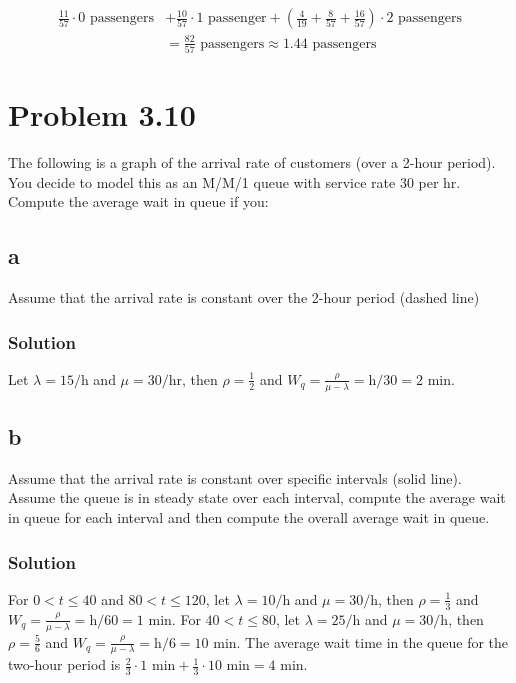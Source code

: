 \documentclass[letterpaper]{amsart}
\begin{document}
\begin{equation*}
\begin{aligned}
  \frac{11}{57}\cdot 0\text{ passengers}
  &+
  \frac{10}{57}\cdot 1\text{ passenger}
  +
  \left(
  \frac{4}{19}
  +
  \frac{8}{57}
  +
  \frac{16}{57}
  \right)\cdot 2\text{ passengers}\\
  &=
  \frac{82}{57}\text{ passengers}
  \approx 1.44\text{ passengers}
\end{aligned}
\end{equation*}


\section{Problem 3.10} %
The following is a graph of the arrival rate of customers (over a 2-hour
period). You decide to model this as an M/M/1 queue with service rate 30
per hr. Compute the average wait in queue if you:
\subsection*{a}
Assume that the arrival rate is constant over the 2-hour period (dashed
line)
\subsubsection*{Solution}
Let
$\lambda=15/\text{h}$
and
$\mu=30/\text{hr}$,
then
$\rho=\frac{1}{2}$
and
$W_q=\frac{\rho}{\mu-\lambda}=\text{h}/30=2\text{ min}$.
\subsection*{b}
Assume that the arrival rate is constant over specific intervals (solid
line). Assume the queue is in steady state over each interval, compute
the average wait in queue for each interval and then compute the overall
average wait in queue.
\subsubsection*{Solution}
For $0<t\leq 40$ and $80<t\leq120$, let
$\lambda=10/\text{h}$
and
$\mu=30/\text{h}$,
then
$\rho=\frac{1}{3}$
and
$W_q=\frac{\rho}{\mu-\lambda}=\text{h}/60=1\text{ min}$.
For $40<t\leq 80$, let
$\lambda=25/\text{h}$
and
$\mu=30/\text{h}$,
then
$\rho=\frac{5}{6}$
and
$W_q=\frac{\rho}{\mu-\lambda}=\text{h}/6=10\text{ min}$.
The average wait time in the queue for the two-hour period is
$\frac{2}{3}\cdot 1\text{ min} + \frac{1}{3}\cdot 10\text{ min}=4\text{ min}$.
\end{document}
